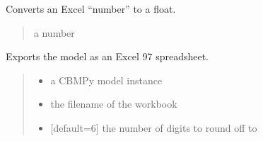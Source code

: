 \documentclass[letterpaper,12pt,english]{sphinxmanual}
\begin{document}
\begin{fulllineitems}

\pysigstartsignatures
\pysiglinewithargsret
{}
{}
{}
\pysigstopsignatures
\sphinxAtStartPar
Converts an Excel “number” to a float.
\begin{quote}\begin{description}
\sphinxAtStartPar
{} \textendash{} a number

\end{description}\end{quote}

\end{fulllineitems}



\begin{fulllineitems}

\pysigstartsignatures
\pysiglinewithargsret
{}
{\sphinxparamcomma {}\sphinxparamcomma {}}
{}
\pysigstopsignatures
\sphinxAtStartPar
Exports the model as an Excel 97 spreadsheet.
\begin{quote}\begin{description}
\begin{itemize}
\item {} 
\sphinxAtStartPar
{} \textendash{} a CBMPy model instance

\item {} 
\sphinxAtStartPar
{} \textendash{} the filename of the workbook

\item {} 
\sphinxAtStartPar
{} \textendash{} {[}default=6{]} the number of digits to round off to

\end{itemize}

\end{description}\end{quote}

\end{fulllineitems}
\end{document}
